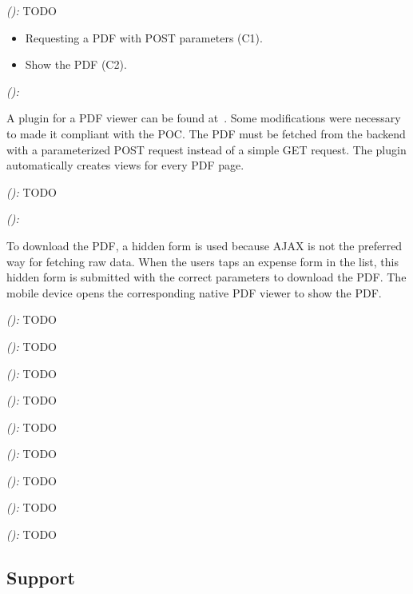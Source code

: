 \documentclass[a4paper]{artikel3}
\newcommand{\framework}[2]{ \emph{#1 (\textbf{#2}): }} %
\begin{document}
\framework{\lungoa{}}{}
TODO

\begin{itemize}
 \item Requesting a PDF with POST parameters (C1).
 \item Show the PDF (C2).
\end{itemize}

\framework{\sta{}}{}

A plugin for a PDF viewer can be found at~\cite{Fiedler2012}.  
Some modifications were necessary to made it compliant with the POC.  
The PDF must be fetched from the backend with a parameterized POST request instead of a simple GET request.  
The plugin automatically creates views for every PDF page.  

\framework{\kendoa{}}{}
TODO

\framework{\jqma{}}{}

To download the PDF, a hidden form is used because AJAX is not the preferred way for fetching raw data.
When the users taps an expense form in the list, this hidden form is submitted with the correct parameters to download the PDF.
The mobile device opens the corresponding native PDF viewer to show the PDF.

\framework{\lungoa{}}{}
TODO


\framework{\sta{}}{}
TODO

\framework{\kendoa{}}{}
TODO

\framework{\jqma{}}{}
TODO

\framework{\lungoa{}}{}
TODO


\framework{\sta{}}{}
TODO

\framework{\kendoa{}}{}
TODO

\framework{\jqma{}}{}
TODO

\framework{\lungoa{}}{}
TODO



\subsection{Support} %
\label{sec:evaluation-support}
\end{document}
